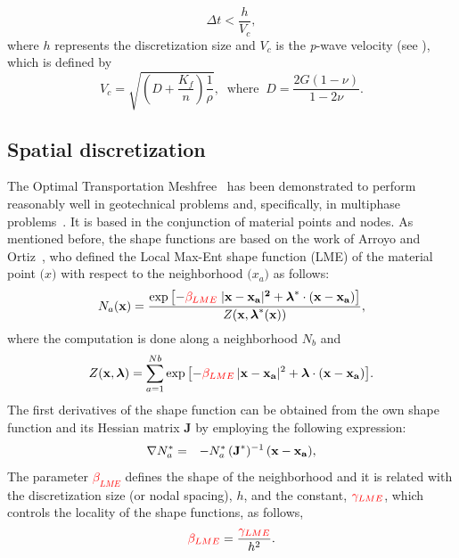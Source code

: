 \documentclass[twocolumn]{svjour3}          %
\begin{document}
  \begin{equation}
\Delta t < \frac{h}{V_c},
\end{equation}
where $h$ represents the discretization size and $V_c$ is the \textit{p}-wave velocity (see \cite{zienkiewicz1980}), which is defined by  
\begin{equation}
V_c=\sqrt{\left( D+\frac{K_f}{n}\right) \frac{1}{\rho}}, \; \; \textrm{where} \;\; D=\frac{2G(1-\nu)}{1-2\nu}.
\end{equation}\label{ex_2}

\subsection{Spatial discretization}
\label{subsec:41}
The Optimal Transportation Meshfree~\cite{li2010,li2014,Huang2019} has been demonstrated to perform reasonably well in geotechnical problems and, specifically, in multiphase problems~\cite{Navas2020}. It is based in the conjunction of material points and nodes. As mentioned before, the shape functions are based on the work of Arroyo and Ortiz~\cite{arroyo2006}, who defined the Local Max-Ent shape function (LME) of the material point $\boldsymbol(x)$ with respect to the neighborhood $\boldsymbol(x_a)$ as follows:
\begin{equation} \label{eq_N1}
N_a(\textbf{x})=\frac{\exp\left[ -\textcolor{red}{\beta_{LME}} \; |\bf x-x_a|^2 +  \boldsymbol{\lambda}^*  \cdot  (x-x_a)  \right] } {Z(\textbf{x},\boldsymbol{\lambda}^*(\textbf{x}))},
\end{equation}
where the computation is done along a neighborhood $N_b$ and 
\begin{equation}\label{eq_N2}
Z({\bf x}, {\boldsymbol{\lambda}}) = \sum_{a=1}^{Nb}{ \exp \left[ -\textcolor{red}{\beta_{LME}} \, |{\bf x-x_a}|^2 + \boldsymbol{\lambda}  \cdot  \bf {(x-x_a)}         \right]}.
\end{equation}
The first derivatives of the shape function can be obtained from the own shape function and its Hessian matrix \textbf{J} by employing the following expression:
\begin{eqnarray}
\nabla N^*_a &=& -N^*_a \,  (\textbf{J}^*)^{-1} \,  (\bf x-x_a) \label{eq_N3} ,
\end{eqnarray}
The parameter \textcolor{red}{$\beta_{LME}$} defines the shape of the neighborhood and it is related with the discretization size (or nodal spacing), $h$,  and the constant, $\textcolor{red}{\gamma_{LME}}$, which controls the locality of the shape functions, as follows,
\begin{equation}\label{eqLM3}
\textcolor{red}{\beta_{LME}}=\frac{\textcolor{red}{\gamma_{LME}}}{h^2}.
\end{equation} 
\end{document}
